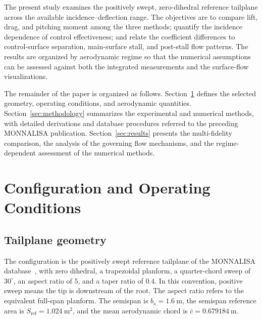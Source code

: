 \documentclass[journal ]{new-aiaa}
\begin{document}
The present study examines the positively swept, zero-dihedral reference tailplane across the available incidence--deflection range.
The objectives are to compare lift, drag, and pitching moment among the three methods; quantify the incidence dependence of control effectiveness; and relate the coefficient differences to control-surface separation, main-surface stall, and post-stall flow patterns.
The results are organized by aerodynamic regime so that the numerical assumptions can be assessed against both the integrated measurements and the surface-flow visualizations.

The remainder of the paper is organized as follows.
Section~\ref{sec:configuration} defines the selected geometry, operating conditions, and aerodynamic quantities.
Section~\ref{sec:methodology} summarizes the experimental and numerical methods, with detailed derivations and database procedures referred to the preceding MONNALISA publication.
Section~\ref{sec:results} presents the multi-fidelity comparison, the analysis of the governing flow mechanisms, and the regime-dependent assessment of the numerical methods.













\section{Configuration and Operating Conditions}
\label{sec:configuration}

\subsection{Tailplane geometry}
\label{sec:geometry}

The configuration is the positively swept reference tailplane of the MONNALISA database~\citep{rausa2026monnalisa}, with zero dihedral, a trapezoidal planform, a quarter-chord sweep of $30^\circ$, an aspect ratio of $5$, and a taper ratio of $0.4$.
In this convention, positive sweep means the tip is downstream of the root. 
The aspect ratio refers to the equivalent full-span planform. The semispan is $b_s=1.6~\mathrm{m}$, the semispan reference area is $S_{\mathrm{ref}}=1.024~\mathrm{m^2}$, and the mean aerodynamic chord is $\bar{c}=0.679184~\mathrm{m}$.
\end{document}
